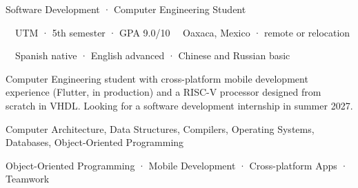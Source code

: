 \documentclass[10pt,letterpaper]{article}
\begin{document}
\cvbackground

\begin{cvheader}
  \cvname
  \vspace{7pt}
  {\color{white}\large Software Development · Computer Engineering Student}\par
  \vspace{5pt}
  {\small\color{side}\faUniversity\ \ UTM · 5th semester · GPA 9.0/10\qquad
   \faMapMarker*\ \ Oaxaca, Mexico · remote or relocation}\par
  \vspace{3pt}
  {\small\color{side}\faLanguage\ \ Spanish native · English advanced · Chinese and Russian basic}
\end{cvheader}

\begin{cvside}
  {\small Computer Engineering student with cross-platform mobile development
  experience (Flutter, in production) and a RISC-V processor designed from scratch in VHDL.
  Looking for a software development internship in summer 2027.}\par

      {Computer Architecture, Data Structures, Compilers, Operating Systems, Databases, Object-Oriented Programming}

  \par
  \vspace{4pt}
  \par
  \vspace{4pt}
  \par
  \vspace{4pt}
  {\footnotesize\color{white}Object-Oriented Programming · Mobile Development · Cross-platform Apps · Teamwork}\par

\end{cvside}
\end{document}
